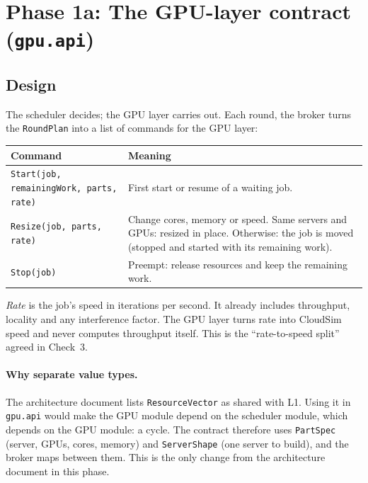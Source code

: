 \documentclass[11pt,a4paper]{article}
\newcommand{\code}[1]{\texttt{#1}}
\begin{document}
\section{Phase 1a: The GPU-layer contract (\code{gpu.api})}\label{sec:api}

\subsection{Design}
The scheduler decides; the GPU layer carries out. Each round, the broker turns the
\code{RoundPlan} into a list of commands for the GPU layer:

\begin{center}
\begin{tabularx}{\linewidth}{@{}lX@{}}
\toprule
Command & Meaning \\
\midrule
\code{Start(job, remainingWork, parts, rate)} & First start or resume of a waiting job. \\
\code{Resize(job, parts, rate)} & Change cores, memory or speed. Same servers and GPUs: resized
  in place. Otherwise: the job is moved (stopped and started with its remaining work). \\
\code{Stop(job)} & Preempt: release resources and keep the remaining work. \\
\bottomrule
\end{tabularx}
\end{center}

\emph{Rate} is the job's speed in iterations per second. It already includes throughput, locality
and any interference factor. The GPU layer turns rate into CloudSim speed and never computes
throughput itself. This is the ``rate-to-speed split'' agreed in Check~3.

\paragraph{Why separate value types.} The architecture document lists \code{ResourceVector} as
shared with L1. Using it in \code{gpu.api} would make the GPU module depend on the scheduler
module, which depends on the GPU module: a cycle. The contract therefore uses \code{PartSpec}
(server, GPUs, cores, memory) and \code{ServerShape} (one server to build), and the broker maps
between them. This is the only change from the architecture document in this phase.
\end{document}
